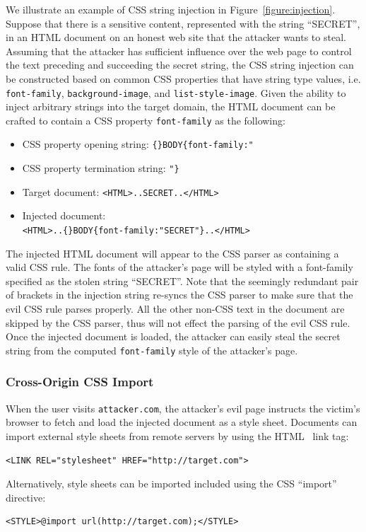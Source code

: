 \documentclass{acm_proc_article-sp}
\begin{document}
We illustrate an example of CSS string injection in Figure~\ref{figure:injection}. Suppose that there is a sensitive content, represented with the string ``SECRET'', in an HTML document on an honest web site that the attacker wants to steal. Assuming that the attacker has sufficient influence over the web page to control the text preceding and succeeding the secret string, the CSS string injection can be constructed based on common CSS properties that have string type values, i.e. \texttt{font-family}, \texttt{background-image}, and \texttt{list-style-image}. Given the ability to inject arbitrary strings into the target domain, the HTML document can be crafted to contain a CSS property \texttt{font-family} as the following:
\begin{itemize}
\item CSS property opening string: \verb|{}BODY{font-family:"|
\item CSS property termination string: \verb|"}|
\item Target document: \verb|<HTML>..SECRET..</HTML>|
\item Injected document: \\
\verb|<HTML>..{}BODY{font-family:"SECRET"}..</HTML>|
\end{itemize}
The injected HTML document will appear to the CSS parser as containing a valid CSS rule. The fonts of the attacker's page will be styled with a font-family specified as the stolen string ``SECRET''. Note that the seemingly redundant pair of brackets in the injection string re-syncs the CSS parser to make sure that the evil CSS rule parses properly. All the other non-CSS text in the document are skipped by the CSS parser, thus will not effect the parsing of the evil CSS rule. Once the injected document is loaded, the attacker can easily steal the secret string from the computed \texttt{font-family} style of the attacker's page.

\subsubsection{Cross-Origin CSS Import}
When the user visits \texttt{attacker.com}, the attacker's evil page instructs the victim's browser to fetch and load the injected document as a style sheet. Documents can import external style sheets from remote servers by using the HTML~\cite{html} link tag:
\begin{verbatim}
<LINK REL="stylesheet" HREF="http://target.com">
\end{verbatim}
Alternatively, style sheets can be imported included using the CSS ``import'' directive:
\begin{verbatim}
<STYLE>@import url(http://target.com);</STYLE>
\end{verbatim}
\end{document}
